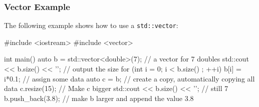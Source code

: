 \documentclass[aspectratio=169,ignorenonframetext,11pt]{beamer}
\def\inline{\lstinline[basicstyle=\small\ttfamily]}
\begin{document}


\begin{frame}[fragile]
\frametitle{Vector Example}
The following example shows how to use a \inline!std::vector!:
\begin{cppcode}
#include <iostream>
#include <vector>

int main() {
    auto b = std::vector<double>(7); // a vector for 7 doubles
    std::cout << b.size() << '\n';   // output the size
    for (int i = 0; i < b.size()	; ++i)
        b[i] = i*0.1; // assign some data
    auto c = b;       // create a copy, automatically copying all data
    c.resize(15);     // Make c bigger
    std::cout << b.size() << '\n';   // still 7
    b.push_back(3.8); // make b larger and append the value 3.8
}
\end{cppcode}
\end{frame}
\end{document}
